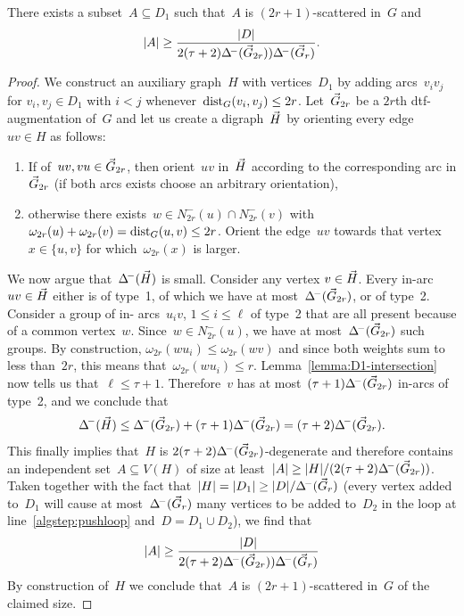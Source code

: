 \begin{lemma}
  There exists a subset~$A \subseteq D_1$ such that~$A$ is
  $(2r+1)$-scattered in~$G$ and
  \[
  	|A| \geq \frac{|D|}{2(\tau+2)\Delta^{\!-}(\vec{G}_{2r}))\Delta^{\!-}(\vec{G}_r)}.
  \]
\end{lemma}
\begin{proof}
  We construct an auxiliary graph~$H$ with vertices~$D_1$ by
  adding arcs~$v_iv_j$ for $v_i,v_j \in D_1$ with $i < j$
  whenever~$\text{dist}_G(v_i,v_j) \leq 2r$.
  Let~$\vec{G}_{2r}$ be a $2r$th dtf-augmentation of~$G$ and
  let us create a digraph~$\vec{H}$ by orienting
  every edge~$uv \in H$ as follows:
  \begin{enumerate}
    \item If of~$uv,vu \in \vec{G}_{2r}$,
          then orient~$uv$ in~$\vec{H}$ according to the corresponding
          arc in $\vec{G}_{2r}$ (if both arcs exists choose an arbitrary
          orientation),
    \item otherwise there exists~$w \in N^-_{2r}(u) \cap N^-_{2r}(v)$
          with~$\omega_{2r}(u) + \omega_{2r}(v) = \text{dist}_G(u,v) \leq 2r$. Orient the edge~$uv$ towards that vertex~$x \in \{u,v\}$
          for which~$\omega_{2r}(x)$ is larger.
  \end{enumerate}
  We now argue that~$\Delta^{\!-}(\vec{H})$ is small. Consider any vertex $v \in
  \vec{H}$. Every in-arc $uv \in \vec{H}$ either is of type~1, of which we have
  at most~$\Delta^{\!-}(\vec{G}_{2r})$, or of type~2. Consider a group of in-
  arcs~$u_iv$, $1 \leq i \leq \ell$ of type~2 that are all present because of
  a common vertex~$w$. Since~$w \in N^-_{2r}(u)$, we have at
  most~$\Delta^{\!-}(\vec{G}_{2r})$ such groups. By construction,
  $\omega_{2r}(wu_i) \leq \omega_{2r}(wv)$ and since both weights sum to less
  than~$2r$, this means that~$\omega_{2r}(wu_i) \leq r$.
  Lemma~\ref{lemma:D1-intersection} now tells us that~$\ell \leq \tau + 1$.
  Therefore~$v$ has at most~$(\tau+1) \Delta^{\!-}(\vec{G}_{2r})$ in-arcs of type~2, and we conclude that
  \[
    \Delta^{\!-}(\vec{H}) \leq \Delta^{\!-}(\vec{G}_{2r}) + (\tau+1)\Delta^{\!-}(\vec{G}_{2r}) = (\tau+2)\Delta^{\!-}(\vec{G}_{2r}).
  \]
  This finally implies that~$H$ is $2(\tau+2)\Delta^{\!-}(\vec{G}_{2r})$-degenerate and therefore contains an independent set~$A \subseteq V(H)$
  of size at least~$|A| \geq |H| / (2(\tau+2)\Delta^{\!-}(\vec{G}_{2r}))$.
  Taken together with the fact that~$|H| = |D_1| \geq |D| / \Delta^{\!-}(\vec{G}_r)$
  (every vertex added to~$D_1$ will cause at most~$\Delta^{\!-}(\vec{G}_r)$ many
  vertices to be added to~$D_2$ in the loop at line~\ref{algstep:pushloop}
  and~$D = D_1 \cup D_2$), we find that
  \[
  	|A| \geq \frac{|D|}{2(\tau+2)\Delta^{\!-}(\vec{G}_{2r}))\Delta^{\!-}(\vec{G}_r)}
  \]
  By construction of~$H$ we conclude that~$A$ is $(2r+1)$-scattered
  in~$G$ of the claimed size.
\end{proof}

